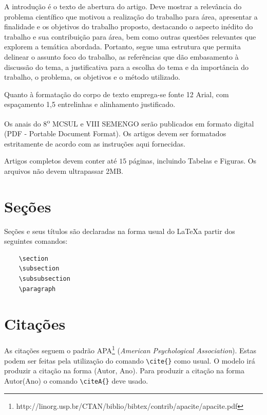 \documentclass[12pt,A4,A4pt]{article}
\begin{document}
A introdução é o texto de abertura do artigo. Deve mostrar a relevância do problema científico que motivou a realização do trabalho para área, apresentar a finalidade e os objetivos do trabalho proposto, destacando o aspecto inédito do trabalho e sua contribuição para área, bem como outras questões relevantes que explorem a temática abordada. Portanto, segue uma estrutura que permita delinear o assunto foco do trabalho, as referências que dão embasamento à discussão do tema, a justificativa para a escolha do tema e da importância do trabalho, o problema, os objetivos e o método utilizado. 

Quanto à formatação do corpo de texto emprega-se fonte 12 Arial, com espaçamento 1,5 entrelinhas e alinhamento justificado. 

Os anais do 8\textsuperscript{o} MCSUL e VIII SEMENGO serão publicados em formato digital (PDF - Portable Document Format). Os artigos devem ser formatados estritamente de acordo com as instruções aqui fornecidas. 

Artigos completos devem conter até $15$ páginas, incluindo Tabelas e Figuras. Os arquivos não devem ultrapassar 2MB.


\section{Seções}
\label{secoes}

\hspace{0.5cm}Seções e seus títulos são declaradas na forma usual do \LaTeX a partir dos seguintes comandos:

\begin{verbatim}
    \section
    \subsection
    \subsubsection
    \paragraph
\end{verbatim}

\section{Citações}
\hspace{0.5cm}As citações seguem o padrão APA\footnote{http://linorg.usp.br/CTAN/biblio/bibtex/contrib/apacite/apacite.pdf} (\textit{American Psychological Association}). Estas podem ser feitas pela utilização do comando \verb|\cite{}| como usual. O modelo irá produzir a citação na forma (Autor, Ano). Para produzir a citação na forma Autor(Ano) o comando  \verb|\citeA{}| deve usado.
\end{document}
